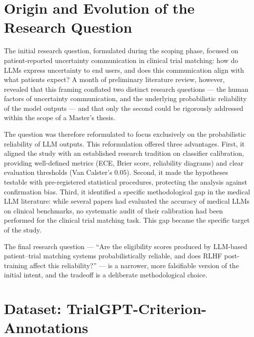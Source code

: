 \section{Origin and Evolution of the Research Question}
\label{sec:ctx-origin}

The initial research question, formulated during the scoping phase, 
focused on patient-reported uncertainty communication in clinical trial 
matching: how do LLMs express uncertainty to end users, and does this 
communication align with what patients expect? A month of preliminary 
literature review, however, revealed that this framing conflated two 
distinct research questions --- the human factors of uncertainty 
communication, and the underlying probabilistic reliability of the 
model outputs --- and that only the second could be rigorously 
addressed within the scope of a Master's thesis.

The question was therefore reformulated to focus exclusively on the 
probabilistic reliability of LLM outputs. This reformulation offered 
three advantages. First, it aligned the study with an established 
research tradition on classifier calibration, providing well-defined 
metrics (ECE, Brier score, reliability diagrams) and clear evaluation 
thresholds (Van Calster's $0.05$). Second, it made the hypotheses 
testable with pre-registered statistical procedures, protecting the 
analysis against confirmation bias. Third, it identified a specific 
methodological gap in the medical LLM literature: while several papers 
had evaluated the accuracy of medical LLMs on clinical benchmarks, no 
systematic audit of their calibration had been performed for the 
clinical trial matching task. This gap became the specific target of 
the study.

The final research question --- ``Are the eligibility scores produced 
by LLM-based patient--trial matching systems probabilistically reliable, 
and does RLHF post-training affect this reliability?'' --- is a 
narrower, more falsifiable version of the initial intent, and the 
tradeoff is a deliberate methodological choice.

\section{Dataset: TrialGPT-Criterion-Annotations}
\label{sec:ctx-dataset}

